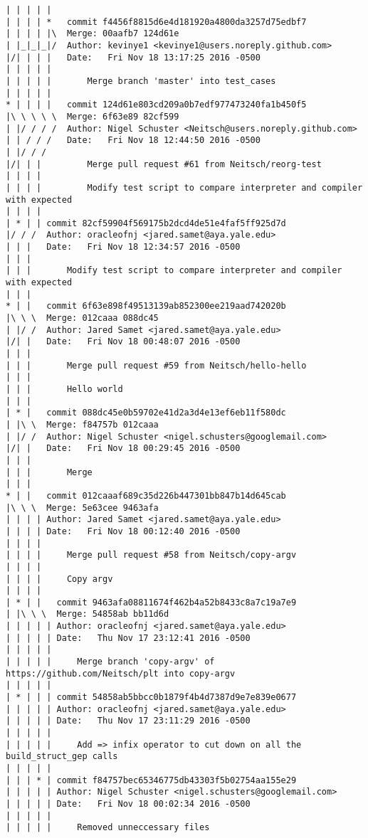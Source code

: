 \begin{lstlisting}
| | | | |        
| | | | *   commit f4456f8815d6e4d181920a4800da3257d75edbf7
| | | | |\  Merge: 00aafb7 124d61e
| |_|_|_|/  Author: kevinye1 <kevinye1@users.noreply.github.com>
|/| | | |   Date:   Fri Nov 18 13:17:25 2016 -0500
| | | | |   
| | | | |       Merge branch 'master' into test_cases
| | | | |        
* | | | |   commit 124d61e803cd209a0b7edf977473240fa1b450f5
|\ \ \ \ \  Merge: 6f63e89 82cf599
| |/ / / /  Author: Nigel Schuster <Neitsch@users.noreply.github.com>
| | / / /   Date:   Fri Nov 18 12:44:50 2016 -0500
| |/ / /    
|/| | |         Merge pull request #61 from Neitsch/reorg-test
| | | |         
| | | |         Modify test script to compare interpreter and compiler with expected
| | | |     
| * | | commit 82cf59904f569175b2dcd4de51e4faf5ff925d7d
|/ / /  Author: oracleofnj <jared.samet@aya.yale.edu>
| | |   Date:   Fri Nov 18 12:34:57 2016 -0500
| | |   
| | |       Modify test script to compare interpreter and compiler with expected
| | |      
* | |   commit 6f63e898f49513139ab852300ee219aad742020b
|\ \ \  Merge: 012caaa 088dc45
| |/ /  Author: Jared Samet <jared.samet@aya.yale.edu>
|/| |   Date:   Fri Nov 18 00:48:07 2016 -0500
| | |   
| | |       Merge pull request #59 from Neitsch/hello-hello
| | |       
| | |       Hello world
| | |      
| * |   commit 088dc45e0b59702e41d2a3d4e13ef6eb11f580dc
| |\ \  Merge: f84757b 012caaa
| |/ /  Author: Nigel Schuster <nigel.schusters@googlemail.com>
|/| |   Date:   Fri Nov 18 00:29:45 2016 -0500
| | |   
| | |       Merge
| | |      
* | |   commit 012caaaf689c35d226b447301bb847b14d645cab
|\ \ \  Merge: 5e63cee 9463afa
| | | | Author: Jared Samet <jared.samet@aya.yale.edu>
| | | | Date:   Fri Nov 18 00:12:40 2016 -0500
| | | | 
| | | |     Merge pull request #58 from Neitsch/copy-argv
| | | |     
| | | |     Copy argv
| | | |       
| * | |   commit 9463afa08811674f462b4a52b8433c8a7c19a7e9
| |\ \ \  Merge: 54858ab bb11d6d
| | | | | Author: oracleofnj <jared.samet@aya.yale.edu>
| | | | | Date:   Thu Nov 17 23:12:41 2016 -0500
| | | | | 
| | | | |     Merge branch 'copy-argv' of https://github.com/Neitsch/plt into copy-argv
| | | | |      
| * | | | commit 54858ab5bbcc0b1879f4b4d7387d9e7e839e0677
| | | | | Author: oracleofnj <jared.samet@aya.yale.edu>
| | | | | Date:   Thu Nov 17 23:11:29 2016 -0500
| | | | | 
| | | | |     Add => infix operator to cut down on all the build_struct_gep calls
| | | | |      
| | | * | commit f84757bec65346775db43303f5b02754aa155e29
| | | | | Author: Nigel Schuster <nigel.schusters@googlemail.com>
| | | | | Date:   Fri Nov 18 00:02:34 2016 -0500
| | | | | 
| | | | |     Removed unneccessary files

\end{lstlisting}
